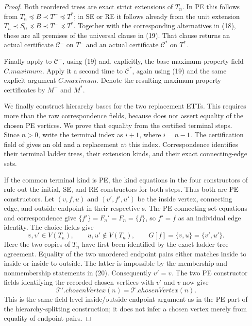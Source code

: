 \begin{proof}
Both reordered trees are exact strict extensions of \(T_n\).  In PE this
follows from \(T_n\preccurlyeq B\prec T^-\preccurlyeq T^*\); in SE or RE
it follows already from the unit extension
\(T_n\prec S_0\preccurlyeq B\prec T^-\preccurlyeq T^*\).  Together with
the corresponding alternatives in (18), these are all premises of the
universal clause in (19).  That clause returns an actual
 certificate
\(\mathcal C^-\) on \(T^-\) and an actual certificate \(\mathcal C^*\)
on \(T^*\).

Finally apply  to
\(\mathcal C^-\), using (19) and, explicitly, the base maximum-property
field \(C.\mathit{maximum}\).  Apply it a second time to
\(\mathcal C^*\), again using (19) and the same explicit argument
\(C.\mathit{maximum}\).  Denote the resulting maximum-property
certificates by \(M^-\) and \(M^*\).

We finally construct hierarchy bases for the two replacement ETTs.  This
requires more than the raw correspondence fields, because
 does not assert equality of
the chosen PE vertices.  We prove that equality from the certified
terminal steps.  Since \(n>0\), write the terminal index as \(i+1\),
where \(i=n-1\).  The certification field of
 gives an old and a replacement
 at this index.  Correspondence identifies
their terminal ladder trees, their extension kinds, and their exact
connecting-edge sets.

If the common terminal kind is PE, the kind equations in the four
constructors of  rule out the initial, SE,
and RE constructors for both steps.  Thus both are PE constructors.  Let
\((v,f,u)\) and \((v',f',u')\) be the inside vertex, connecting edge,
and outside endpoint in their respective
s.  The PE connecting-set equations and
correspondence give
\(\{f'\}=F_n'=F_n=\{f\}\), so \(f'=f\) as an individual edge identity.
The choice fields give
\[
 v,v'\in V(T_n),\qquad u,u'\notin V(T_n),
 \qquad
 G[f]=\{v,u\}=\{v',u'\}.                                  \tag{20}
\]
Here the two copies of \(T_n\) have first been identified by the exact
ladder-tree agreement.  Equality of the two unordered endpoint pairs
either matches inside to inside or inside to outside.  The latter is
impossible by the membership and nonmembership statements in (20).
Consequently \(v'=v\).  The two PE constructor fields identifying the
recorded chosen vertices with \(v'\) and \(v\) now give
\[
 \mathcal T'.\mathit{chosenVertex}(n)
   =\mathcal T.\mathit{chosenVertex}(n).                    \tag{21}
\]
This is the same field-level inside/outside endpoint argument as in the
PE part of the hierarchy-splitting construction; it does not infer a
chosen vertex merely from equality of endpoint pairs.


\end{proof}
